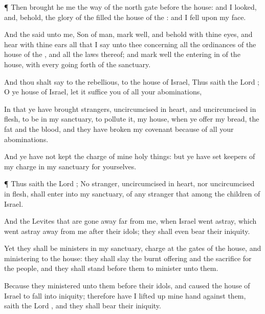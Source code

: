 {\par }{\PP {}¶ Then
brought he me the
way of the
north
gate
before the
house: and I
looked, and, behold, the
glory of the
{}
filled the
house of the
{}: and I
fell upon my
face.

And the
{}
said unto me,
Son of
man,
mark
well, and
behold with thine
eyes, and
hear with thine
ears all that I
say unto thee concerning all the
ordinances of the
house of the
{}, and all the
laws thereof; and
mark
well the entering
in of the
house, with every going
forth of the
sanctuary.

And thou shalt
say to the
rebellious,
{} to the
house of
Israel, Thus
saith the
Lord
{}; O ye
house of
Israel, let it
suffice you of all your
abominations,

In that ye have
brought
{}
strangers,
uncircumcised in
heart, and
uncircumcised in
flesh, to be in my
sanctuary, to
pollute it,
{} my
house, when ye
offer my
bread, the
fat and the
blood, and they have
broken my
covenant
because of all your
abominations.

And ye have not
kept the
charge of mine holy
things: but ye have
set
keepers of my
charge in my
sanctuary for yourselves.


\par }{\PP {}¶ Thus
saith the
Lord
{}; No
stranger,
uncircumcised in
heart, nor
uncircumcised in
flesh, shall
enter into my
sanctuary, of any stranger that
{}
among the
children of
Israel.


\par }{\PP {}And the
Levites that are gone away
far from me, when
Israel went
astray, which went astray
away from me
after their
idols; they shall even
bear their
iniquity.

Yet they shall be
ministers in my
sanctuary,
{}
charge at the
gates of the
house, and
ministering to the
house: they shall
slay the burnt
offering and the
sacrifice for the
people, and they shall
stand
before them to
minister unto them.

Because they
ministered unto them
before their
idols, and caused the
house of
Israel to
fall into
iniquity; therefore have I lifted
up mine
hand against them,
saith the
Lord
{}, and they shall
bear their
iniquity.

}
